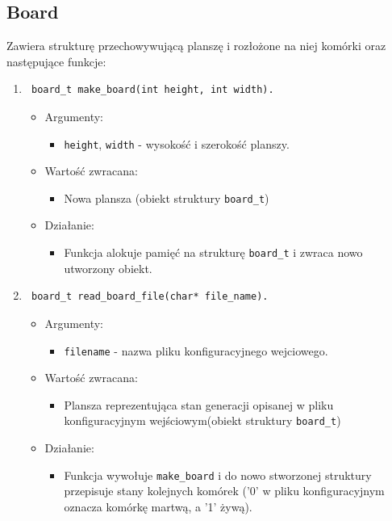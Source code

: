 \documentclass[a4paper,11pt, notitlepage ]{article}
\begin{document}
\subsection{Board}
Zawiera strukturę przechowywującą planszę i rozłożone na niej komórki oraz następujące funkcje:
\begin{enumerate}

\item \begin{verbatim} board_t make_board(int height, int width). \end{verbatim}
\begin{itemize}
\item Argumenty:
\begin{itemize}
\item \verb+height+, \verb+width+ - wysokość i szerokość planszy.
\end{itemize}
\item Wartość zwracana:
\begin{itemize}
\item Nowa plansza (obiekt struktury \verb+board_t+)
\end{itemize}
\item Działanie:
\begin{itemize}
\item Funkcja alokuje pamięć na strukturę \verb+board_t+ i zwraca nowo utworzony obiekt.
\end{itemize}
\end{itemize}


\item \begin{verbatim} board_t read_board_file(char* file_name). \end{verbatim}
\begin{itemize}
\item Argumenty:
\begin{itemize}
\item \verb+filename+ - nazwa pliku konfiguracyjnego wejciowego.
\end{itemize}
\item Wartość zwracana:
\begin{itemize}
\item Plansza reprezentująca stan generacji opisanej w pliku konfiguracyjnym wejściowym(obiekt struktury \verb+board_t+)
\end{itemize}
\item Działanie:
\begin{itemize}
\item Funkcja wywołuje \verb+make_board+ i do nowo stworzonej struktury przepisuje stany kolejnych komórek ('0' w pliku konfiguracyjnym oznacza komórkę martwą, a '1' żywą).
\end{itemize}
\end{itemize}





\end{enumerate}
\end{document}
